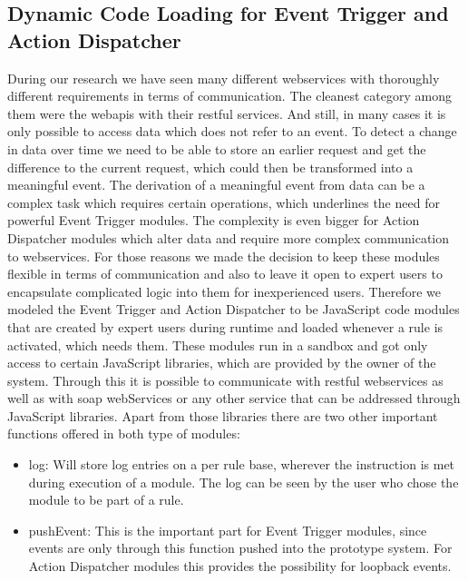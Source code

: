 \subsection{Dynamic Code Loading for Event Trigger and Action Dispatcher}
During our research we have seen many different \textrm{\glspl{webservice}} with thoroughly different requirements in terms of communication.
The cleanest category among them were the \textrm{\glspl{webapi}} with their \textrm{\acrshort{rest}}ful services.
And still, in many cases it is only possible to access data which does not refer to an event.
To detect a change in data over time we need to be able to store an earlier request and get the difference to the current request, which could then be transformed into a meaningful event.
The derivation of a meaningful event from data can be a complex task which requires certain operations, which underlines the need for powerful \textrm{Event Trigger} modules.
The complexity is even bigger for \textrm{Action Dispatcher} modules which alter data and require more complex communication to \textrm{\glspl{webservice}}.
For those reasons we made the decision to keep these modules flexible in terms of communication and also to leave it open to expert users to encapsulate complicated logic into them for inexperienced users.
Therefore we modeled the \textrm{Event Trigger} and \textrm{Action Dispatcher} to be \textrm{JavaScript} code modules that are created by expert users during runtime and loaded whenever a rule is activated, which needs them.
These modules run in a sandbox and got only access to certain \textrm{JavaScript} libraries, which are provided by the owner of the system.
Through this it is possible to communicate with \textrm{\acrshort{rest}}ful \textrm{\glspl{webservice}} as well as with \textrm{\acrshort{soap}} \textrm{\glspl{webService}} or any other service that can be addressed through \textrm{JavaScript} libraries. 
Apart from those libraries there are two other important functions offered in both type of modules:
\begin{itemize}
	\item \textrm{log}: Will store log entries on a per rule base, wherever the instruction is met during execution of a module. The log can be seen by the user who chose the module to be part of a rule.
	\item \textrm{pushEvent}: This is the important part for \textrm{Event Trigger} modules, since events are only through this function pushed into the prototype system. For \textrm{Action Dispatcher} modules this provides the possibility for loopback events.
\end{itemize}
